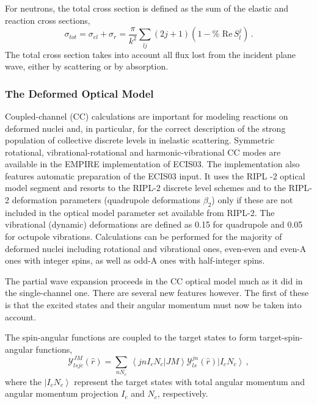 For neutrons, the total cross section is defined as the sum of the elastic
and reaction cross sections,
\begin{equation}
\sigma_{tot}=\sigma_{el}+\sigma_{r}=\frac{\pi}{k^{2}}\sum_{lj}(2j+1)(1-\text{%
Re}\, S_{l}^{j})\,.
\end{equation}
The total cross section takes into account all flux lost from the incident
plane wave, either by scattering or by absorption.

\subsubsection{The Deformed Optical Model\label{sec:DWBA-CC}}

Coupled-channel (CC) calculations are important for modeling reactions on
deformed nuclei and, in particular, for the correct description of the strong
population of collective discrete levels in inelastic scattering.
Symmetric rotational, vibrational-rotational and harmonic-vibrational CC
modes are available in the EMPIRE implementation of ECIS03. The
implementation also features automatic preparation of the ECIS03 input. It
uses the RIPL%
-2 \cite{RIPL2} optical model segment and resorts to the RIPL-2
discrete level schemes and to the RIPL-2 deformation parameters (quadrupole
deformations $\beta _{2}$) only if these are not included in the optical
model parameter set available from RIPL-2. The vibrational (dynamic)
deformations are defined as 0.15 for quadrupole and 0.05 for octupole
vibrations. Calculations can be performed for the majority of deformed
nuclei including rotational and vibrational ones, even-even and even-A
ones with integer spins, as well as odd-A ones with half-integer spins.

The partial wave expansion proceeds in the CC optical model much as it did
in the single-channel one. There are several new features however. The first
of these is that the excited states and their angular momentum must now be
taken into account.

The spin-angular functions are coupled to the target states to form
target-spin-angular functions,
\begin{equation}
{\mathcal{Y}}_{lsjc}^{JM}(%
\hat{r})=\sum_{nN_{c}}\,\left\langle jnI_{c}N_{c}|JM\right\rangle {\mathcal{Y%
}}_{ls}^{jn}(\hat{r})\left|I_{c}N_{c}\right\rangle \,,
\end{equation}
where the $\left|I_{c}N_{c}\right\rangle $ represent the target states with
total angular momentum and angular momentum projection $I_{c}$ and $N_{c}$,
respectively.

